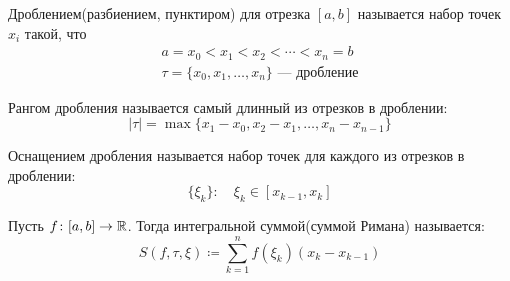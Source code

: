 \begin{conj}
    Дроблением(разбиением, пунктиром) для отрезка $[a, b]$ называется набор точек $x_i$ такой, что
    \begin{equation*}
        \begin{gathered}
            a = x_0 < x_1 < x_2 < \dotsb < x_n = b\\
            \tau = \{x_0, x_1, \dotsc, x_n\}\text{ --- дробление}
        \end{gathered}
    \end{equation*}

    Рангом дробления называется самый длинный из отрезков в дроблении:
    \begin{equation*}
        |\tau| = \max\{x_1 - x_0, x_2 - x_1, \dotsc, x_n - x_{n - 1}\}
    \end{equation*}

    Оснащением дробления называется набор точек для каждого из отрезков в дроблении:
    \begin{equation*}
        \{\xi_k\}\colon \quad \xi_k \in [x_{k - 1}, x_k]
    \end{equation*}

    Пусть $f\colon [a, b] \to \mathbb{R}$. Тогда интегральной суммой(суммой Римана) называется:
    \begin{equation*}
        S(f, \tau, \xi) \coloneqq \sum\limits_{k = 1}^{n} f(\xi_k)(x_k - x_{k - 1})
    \end{equation*}
\end{conj}

